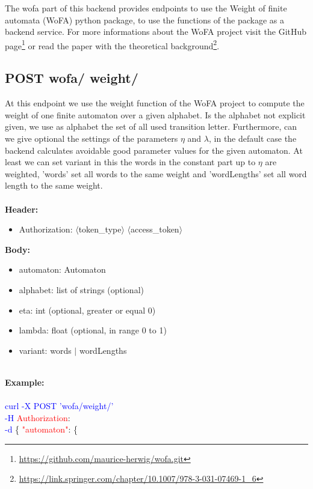 The wofa part of this backend provides endpoints to use the Weight of finite automata (WoFA) python package, to use the functions of the package as a backend service. For more informations about the WoFA project visit the GitHub page\footnote{\url{https://github.com/maurice-herwig/wofa.git}} or read the paper with the theoretical background\footnote{\url{https://link.springer.com/chapter/10.1007/978-3-031-07469-1_6}}.
\subsection{POST wofa/ weight/}
At this endpoint we use the weight function of the WoFA project to compute the weight of one finite automaton over a given alphabet. Is the alphabet not explicit given, we use as alphabet the set of all used transition letter. Furthermore, can we give optional the settings of the parameters $\eta$ and $\lambda$, in the default case the backend calculates avoidable good parameter values for the given automaton. At least we can set variant in this the words in the constant part up to $\eta$ are weighted, 'words' set all words to the same weight and 'wordLengths' set all word length to the same weight. \\
\ \\
\textbf{Header:}
\begin{itemize}
    \item Authorization: $\langle$token\_type$\rangle$ $\langle$access\_token$\rangle$
\end{itemize}
\textbf{Body:}
\begin{itemize}
     \item automaton: Automaton
    \item alphabet: list of strings (optional)
    \item eta: int (optional, greater or equal 0)
    \item lambda: float (optional, in range 0 to 1)
    \item variant: words $|$ wordLengths
\end{itemize}
\ \\
\textbf{Example:} \\
\ \\
\textcolor{blue}{curl -X POST '\BaseURL wofa/weight/'\\
-H} \textcolor{red}{Authorization}: \Auth \\
\textcolor{blue}{-d} \{ 
     \textcolor{red}{"automaton"}: \{
